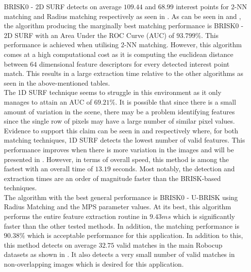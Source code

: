 \documentclass{report}
\begin{document}
BRISK0 - 2D SURF detects on average $109.44$ and $68.99$ interest points for 2-NN matching and Radius matching respectively as seen in . As can be seen in  and , the algorithm producing the marginally best matching performance is BRISK0 - 2D SURF with an Area Under the ROC Curve (AUC) of $93.799\%$. This performance is achieved when utilising 2-NN matching. However, this algorithm comes at a high computational cost as it is computing the euclidean distance between $64$ dimensional feature descriptors for every detected interest point match. This results in a large extraction time relative to the other algorithms as seen in the above-mentioned tables. \\


The 1D SURF technique seems to struggle in this environment as it only manages to attain an AUC of $69.21\%$. It is possible that since there is a small amount of variation in the scene, there may be a problem identifying features since the single row of pixels may have a large number of similar pixel values. Evidence to support this claim can be seen in  and  respectively where, for both matching techniques, 1D SURF detects the lowest number of valid features. This performance improves when there is more variation in the images and will be presented in . However, in terms of overall speed, this method is among the fastest with an overall time of $13.19$ seconds. Most notably, the detection and extraction times are an order of magnitude faster than the BRISK-based techniques.\\

The algorithm with the best general performance is BRISK0 - U-BRISK using Radius Matching and the MPS parameter values. At its best, this algorithm performs the entire feature extraction routine in $9.43 ms$ which is significantly faster than the other tested methods. In addition, the matching performance is $90.38\%$ which is acceptable performance for this application. In addition to this, this method detects on average $32.75$ valid matches in the main Robocup datasets as shown in . It also detects a very small number of valid matches in non-overlapping images which is desired for this application.\\
\end{document}
